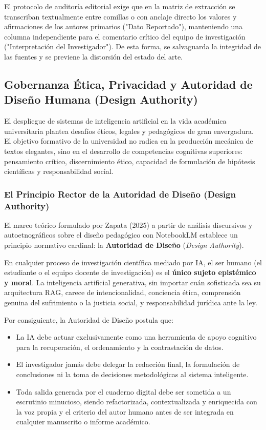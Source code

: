 El protocolo de auditoría editorial exige que en la matriz de extracción se transcriban textualmente entre comillas o con anclaje directo los valores y afirmaciones de los autores primarios ("Dato Reportado"), manteniendo una columna independiente para el comentario crítico del equipo de investigación ("Interpretación del Investigador"). De esta forma, se salvaguarda la integridad de las fuentes y se previene la distorsión del estado del arte.

\vspace{0.4cm}

\subsection{Gobernanza Ética, Privacidad y Autoridad de Diseño Humana (Design Authority)}

El despliegue de sistemas de inteligencia artificial en la vida académica universitaria plantea desafíos éticos, legales y pedagógicos de gran envergadura. El objetivo formativo de la universidad no radica en la producción mecánica de textos elegantes, sino en el desarrollo de competencias cognitivas superiores: pensamiento crítico, discernimiento ético, capacidad de formulación de hipótesis científicas y responsabilidad social.

\subsubsection{El Principio Rector de la Autoridad de Diseño (Design Authority)}

El marco teórico formulado por Zapata (2025) a partir de análisis discursivos y autoetnográficos sobre el diseño pedagógico con NotebookLM establece un principio normativo cardinal: la \textbf{Autoridad de Diseño} (\textit{Design Authority}).

En cualquier proceso de investigación científica mediado por IA, el ser humano (el estudiante o el equipo docente de investigación) es el \textbf{único sujeto epistémico y moral}. La inteligencia artificial generativa, sin importar cuán sofisticada sea su arquitectura RAG, carece de intencionalidad, conciencia ética, comprensión genuina del sufrimiento o la justicia social, y responsabilidad jurídica ante la ley.

Por consiguiente, la Autoridad de Diseño postula que:
\begin{itemize}
    \item La IA debe actuar exclusivamente como una herramienta de apoyo cognitivo para la recuperación, el ordenamiento y la contrastación de datos.
    \item El investigador jamás debe delegar la redacción final, la formulación de conclusiones ni la toma de decisiones metodológicas al sistema inteligente.
    \item Toda salida generada por el cuaderno digital debe ser sometida a un escrutinio minucioso, siendo refactorizada, contextualizada y enriquecida con la voz propia y el criterio del autor humano antes de ser integrada en cualquier manuscrito o informe académico.
\end{itemize}

